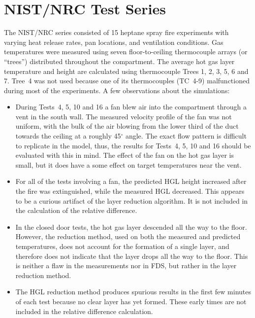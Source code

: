 \section{NIST/NRC Test Series}

The NIST/NRC series consisted of 15 heptane spray fire experiments with varying heat release rates, pan locations, and ventilation conditions. Gas temperatures were measured using seven floor-to-ceiling thermocouple arrays (or ``trees'') distributed throughout the compartment.  The average hot gas layer temperature and height are calculated using thermocouple Trees 1, 2, 3, 5, 6 and 7. Tree~4 was not used because one of its thermocouples (TC~4-9) malfunctioned during most of the experiments. A few observations about the simulations:
\begin{itemize}
\item During Tests~4, 5, 10 and 16 a fan blew air into the compartment through a vent in the south wall. The measured velocity profile of the fan was not uniform, with the bulk of the air blowing from the lower third of the duct towards the ceiling at a roughly 45$^\circ$ angle.  The exact flow pattern is difficult to replicate in the model, thus, the results for Tests~4, 5, 10 and 16 should be evaluated with this in mind. The effect of the fan on the hot gas layer is small, but it does have a some effect on target temperatures near the vent.
\item For all of the tests involving a fan, the predicted HGL height increased after the fire was extinguished, while the measured HGL decreased.  This appears to be a curious artifact of the layer reduction algorithm. It is not included in the calculation of the relative difference.
\item In the closed door tests, the hot gas layer descended all the way to the floor. However, the reduction method, used on both the measured and predicted temperatures, does not account for the formation of a single layer, and therefore does not indicate that the layer drops all the way to the floor. This is neither a flaw in the measurements nor in FDS, but rather in the layer reduction method.
\item The HGL reduction method produces spurious results in the first few minutes of each test because no clear layer has yet formed. These early times are not included in the relative difference calculation.
\end{itemize}

\newpage


